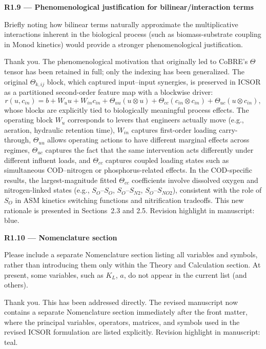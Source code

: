 \documentclass[a4paper,11pt]{article}
\newcommand{\reviewlabel}[1]{\noindent\textbf{\textcolor{accentblue}{#1}}\par\medskip}
\newcommand{\revhighlight}[2]{\textcolor{#1}{Revision highlight in manuscript: #2.}}
\begin{document}
\reviewlabel{R1.9 --- Phenomenological justification for bilinear/interaction terms}
\begin{reviewbox}
Briefly noting how bilinear terms naturally approximate the multiplicative interactions inherent in the biological process (such as biomass-substrate coupling in Monod kinetics) would provide a stronger phenomenological justification.
\end{reviewbox}

Thank you. The phenomenological motivation that originally led to CoBRE's $\Theta$ tensor has been retained in full; only the indexing has been generalized. The original $\Theta_{k,ij}$ block, which captured input--input synergies, is preserved in ICSOR as a partitioned second-order feature map with a blockwise driver:
\[
r(u, c_{in}) = b + W_u u + W_{in} c_{in} + \Theta_{uu}(u \otimes u) + \Theta_{cc}(c_{in} \otimes c_{in}) + \Theta_{uc}(u \otimes c_{in}),
\]
whose blocks are explicitly tied to biologically meaningful process effects. The operating block $W_u$ corresponds to levers that engineers actually move (e.g., aeration, hydraulic retention time), $W_{in}$ captures first-order loading carry-through, $\Theta_{uu}$ allows operating actions to have different marginal effects across regimes, $\Theta_{uc}$ captures the fact that the same intervention acts differently under different influent loads, and $\Theta_{cc}$ captures coupled loading states such as simultaneous COD--nitrogen or phosphorus-related effects. In the COD-specific results, the largest-magnitude fitted $\Theta_{cc}$ coefficients involve dissolved oxygen and nitrogen-linked states (e.g., $S_O$--$S_O$, $S_O$--$S_{N2}$, $S_O$--$S_{NO2}$), consistent with the role of $S_O$ in ASM kinetics switching functions and nitrification tradeoffs. This new rationale is presented in Sections~2.3 and 2.5. \revhighlight{revDefault}{blue}

\reviewlabel{R1.10 --- Nomenclature section}
\begin{reviewbox}
Please include a separate Nomenclature section listing all variables and symbols, rather than introducing them only within the Theory and Calculation section. At present, some variables, such as $K_L$, $a$, do not appear in the current list (and others).
\end{reviewbox}

Thank you. This has been addressed directly. The revised manuscript now contains a separate Nomenclature section immediately after the front matter, where the principal variables, operators, matrices, and symbols used in the revised ICSOR formulation are listed explicitly. \revhighlight{revRoneTen}{teal}
\end{document}
